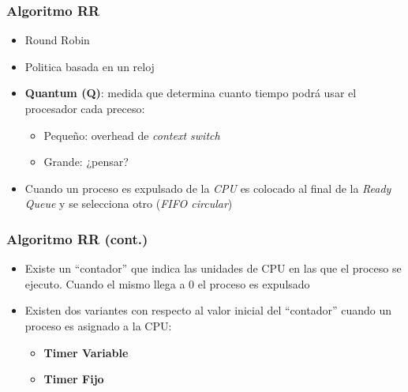 \begin{frame}
  \frametitle{Algoritmo \textbf{RR}}
  \begin{itemize}
  		\item Round Robin
		\item Politica basada en un reloj
		\item \textbf{Quantum (Q)}: medida que determina cuanto tiempo podrá usar el procesador cada preceso:
		\begin{itemize}
			\item Pequeño: overhead de \textit{context switch}
			\item Grande: ¿pensar?
		\end{itemize}
		\item Cuando un proceso es expulsado de la \textit{CPU} es colocado al final de la \textit{Ready Queue} y se selecciona otro (\textit{FIFO circular})
  \end{itemize}
\end{frame}

\begin{frame}
  \frametitle{Algoritmo \textbf{RR} (cont.)}
  \begin{itemize}
  		\item Existe un ``contador'' que indica las unidades de CPU en las que el proceso se ejecuto. Cuando el mismo llega a 0 el proceso es expulsado
		\item Existen dos variantes con respecto al valor inicial del ``contador'' cuando un proceso es asignado a la CPU:
		\begin{itemize}
			\item \textbf{Timer Variable}
			\item \textbf{Timer Fijo}
		\end{itemize}
  \end{itemize}
\end{frame}


